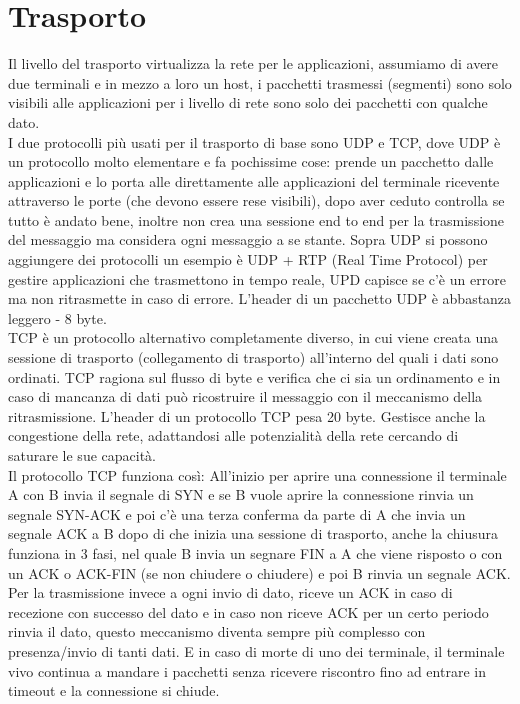 \documentclass[11pt, twocolumn]{article}
\begin{document}
\section{Trasporto}
Il livello del trasporto virtualizza la rete per le applicazioni, assumiamo di avere due terminali e in mezzo a loro un host, i pacchetti trasmessi (segmenti) sono solo visibili alle applicazioni per i livello di rete sono solo dei pacchetti con qualche dato.\\
I due protocolli più usati per il trasporto di base sono UDP e TCP, dove UDP è un protocollo molto elementare e fa pochissime cose: prende un pacchetto dalle applicazioni e lo porta alle direttamente alle applicazioni del terminale ricevente attraverso le porte (che devono essere rese visibili), dopo aver ceduto controlla se tutto è andato bene, inoltre non crea una sessione end to end per la trasmissione del messaggio ma considera ogni messaggio a se stante.  
Sopra UDP si possono aggiungere dei protocolli un esempio è UDP + RTP (Real Time Protocol) per gestire applicazioni che trasmettono in tempo reale, UPD capisce se c'è un errore ma non ritrasmette in caso di errore. 
L'header di un pacchetto UDP è abbastanza leggero - 8 byte.\\
TCP è un protocollo alternativo completamente diverso, in cui viene creata una sessione di trasporto (collegamento di trasporto) all'interno del quali i dati sono ordinati.
TCP ragiona sul flusso di byte e verifica che ci sia un ordinamento e in caso di mancanza di dati può ricostruire il messaggio con il meccanismo della ritrasmissione.
L'header di un protocollo TCP pesa 20 byte. 
Gestisce anche la congestione della rete, adattandosi alle potenzialità della rete cercando di saturare le sue capacità.\\
Il protocollo TCP funziona così:
All'inizio per aprire una connessione il terminale A con B invia il segnale di SYN e se B vuole aprire la connessione rinvia un segnale SYN-ACK e poi c'è una terza conferma da parte di A che invia un segnale ACK a B dopo di che inizia una sessione di trasporto, anche la chiusura funziona in 3 fasi, nel quale B invia un segnare FIN a A che viene risposto o con un ACK o ACK-FIN (se non chiudere o chiudere) e poi B rinvia un segnale ACK. 
Per la trasmissione invece a ogni invio di dato, riceve un ACK in caso di recezione con successo del dato e in caso non riceve ACK per un certo periodo rinvia il dato, questo meccanismo diventa sempre più complesso con presenza/invio di tanti dati.
E in caso di morte di uno dei terminale, il terminale vivo continua a mandare i pacchetti senza ricevere riscontro fino ad entrare in timeout e la connessione si chiude.\\
\end{document}
